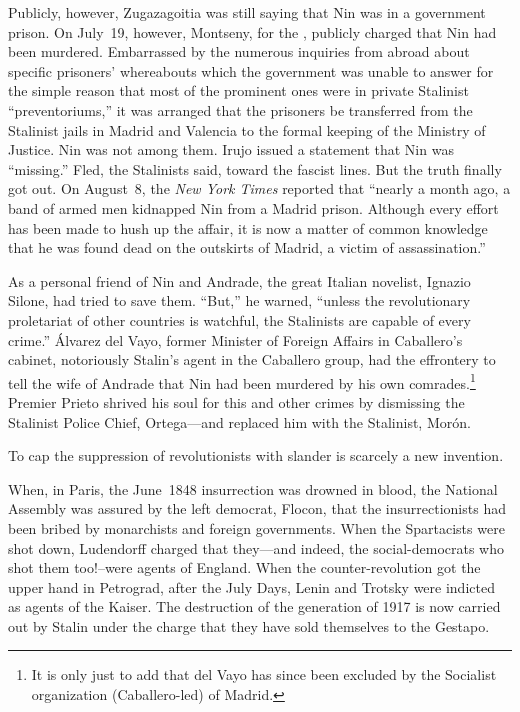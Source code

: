 Publicly, however, Zugazagoitia was still saying that Nin was in a government prison. On July~19, however, Montseny, for the \CNT, publicly charged that Nin had been murdered. Embarrassed by the numerous inquiries from abroad about specific prisoners’ whereabouts which the government was unable to answer for the simple reason that most of the prominent ones were in private Stalinist ``preventoriums,'' it was arranged that the prisoners be transferred from the Stalinist jails in Madrid and Valencia to the formal keeping of the Ministry of Justice. Nin was not among them. Irujo issued a statement that Nin was ``missing.'' Fled, the Stalinists said, toward the fascist lines. But the truth finally got out. On August~8, the \emph{New York Times} reported that ``nearly a month ago, a band of armed men kidnapped Nin from a Madrid prison. Although every effort has been made to hush up the affair, it is now a matter of common knowledge that he was found dead on the outskirts of Madrid, a victim of assassination.''

As a personal friend of Nin and Andrade, the great Italian novelist, Ignazio Silone, had tried to save them. ``But,'' he warned, ``unless the revolutionary proletariat of other countries is watchful, the Stalinists are capable of every crime.'' \'Alvarez del Vayo, former Minister of Foreign Affairs in Caballero’s cabinet, notoriously Stalin’s agent in the Caballero group, had the effrontery to tell the wife of Andrade that Nin had been murdered by his own comrades.\footnote{It is only just to add that del Vayo has since been excluded by the Socialist organization (Caballero-led) of Madrid.} Premier Prieto shrived his soul for this and other crimes by dismissing the Stalinist Police Chief, Ortega---and replaced him with the Stalinist, Mor\'on.

To cap the suppression of revolutionists with slander is scarcely a new invention.

When, in Paris, the June~1848 insurrection was drowned in blood, the National Assembly was assured by the left democrat, Flocon, that the insurrectionists had been bribed by monarchists and foreign governments. When the Spartacists were shot down, Ludendorff charged that they---and indeed, the social-democrats who shot them too!--were agents of England. When the counter-revolution got the upper hand in Petrograd, after the July Days, Lenin and Trotsky were indicted as agents of the Kaiser. The destruction of the generation of 1917 is now carried out by Stalin under the charge that they have sold themselves to the Gestapo.

